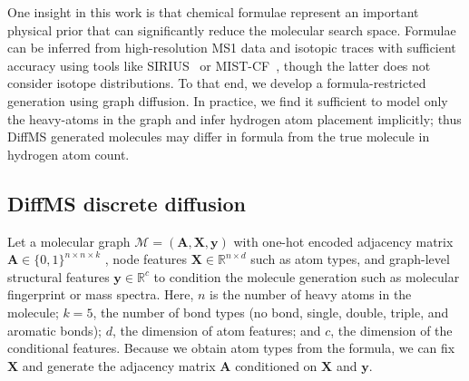 \documentclass{article}
\theoremstyle{plain}
\theoremstyle{definition}
\theoremstyle{remark}
\newcommand{\ours}{DiffMS\xspace}
\begin{document}

One insight in this work is that chemical formulae represent an important physical prior that can significantly reduce the molecular search space. Formulae can be inferred from high-resolution MS1 data and isotopic traces with sufficient accuracy using tools like SIRIUS~\citep{bocker2016fragmentation} or MIST-CF~\citep{goldman2023mist-cf}, though the latter does not consider isotope distributions. To that end, we develop a formula-restricted generation using graph diffusion.  In practice, we find it sufficient to model only the heavy-atoms in the graph and infer hydrogen atom placement implicitly; thus \ours generated molecules may differ in formula from the true molecule in hydrogen atom count. 




\subsection{\ours discrete diffusion}

Let a molecular graph $\mathcal{M} = \left(\mathbf{A}, \mathbf{X}, \mathbf{y}\right)$ with one-hot encoded adjacency matrix %
$\mathbf{A} \in \{0,1\}^{n \times n \times k}$
, node features $\mathbf{X}\in \mathbb{R}^{n \times d}$ such as atom types, and graph-level structural features $\mathbf{y} \in \mathbb{R}^c$ to condition the molecule generation such as molecular fingerprint or mass spectra. Here, $n$ is the number of heavy atoms in the molecule; $k = 5$, the number of bond types (no bond, single, double, triple, and aromatic bonds); $d$, the dimension of atom features; and $c$, the dimension of the conditional features. Because we obtain atom types from the formula, we can fix $\mathbf{X}$ and generate the adjacency matrix $\mathbf{A}$ conditioned on $\mathbf{X}$ and $\mathbf{y}$.
\end{document}
